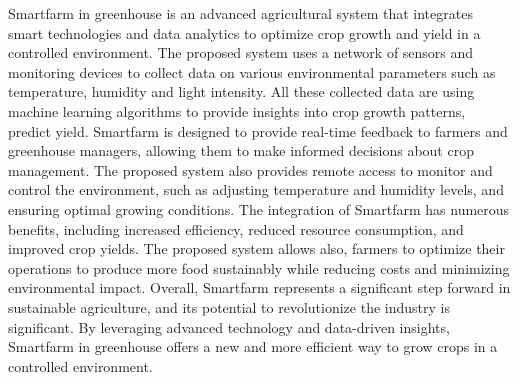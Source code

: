 \begin{abstractEn}
	
	Smartfarm in greenhouse is an advanced agricultural system that integrates
	smart technologies and data analytics to optimize crop growth and yield in a
	controlled environment. The proposed system uses a network of sensors and
	monitoring devices to collect data on various environmental parameters such
	as temperature, humidity and light intensity. All these collected data are using
	machine learning algorithms to provide insights into crop growth patterns,
	predict yield.
	Smartfarm is designed to provide real-time feedback to farmers and
	greenhouse managers, allowing them to make informed decisions about crop
	management. The proposed system also provides remote access to monitor
	and control the environment, such as adjusting temperature and humidity
	levels, and ensuring optimal growing conditions.
	The integration of Smartfarm has numerous benefits, including increased
	efficiency, reduced resource consumption, and improved crop yields. The
	proposed system allows also, farmers to optimize their operations to produce more
	food sustainably while reducing costs and minimizing environmental impact.
	Overall, Smartfarm represents a significant step forward in sustainable
	agriculture, and its potential to revolutionize the industry is significant. By
	leveraging advanced technology and data-driven insights, Smartfarm in
	greenhouse offers a new and more efficient way to grow crops in a controlled
	environment.
	
\end{abstractEn}

